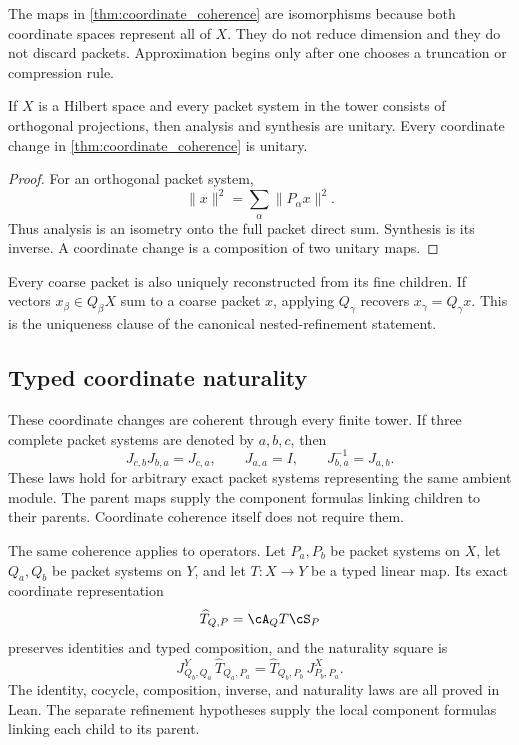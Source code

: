 \begin{remark}\label{rem:refinement_reduction}
The maps in \cref{thm:coordinate_coherence} are isomorphisms because both coordinate spaces represent all of $X$.  They do not reduce dimension and they do not discard packets.  Approximation begins only after one chooses a truncation or compression rule.
\end{remark}

\begin{corollary}\label{cor:orthogonal_isometry}
If $X$ is a Hilbert space and every packet system in the tower consists of orthogonal projections, then analysis and synthesis are unitary.  Every coordinate change in \cref{thm:coordinate_coherence} is unitary.
\end{corollary}

\begin{proof}
For an orthogonal packet system,
\[
\|x\|^2=\sum_\alpha\|P_\alpha x\|^2.
\]
Thus analysis is an isometry onto the full packet direct sum.  Synthesis is its inverse.  A coordinate change is a composition of two unitary maps.
\end{proof}

Every coarse packet is also uniquely reconstructed from its fine children.  If vectors $x_\beta\in Q_\beta X$ sum to a coarse packet $x$, applying $Q_\gamma$ recovers $x_\gamma=Q_\gamma x$.  This is the uniqueness clause of the canonical nested-refinement statement.

\subsection{Typed coordinate naturality}
These coordinate changes are coherent through every finite tower. If three
complete packet systems are denoted by $a,b,c$, then
\[
J_{c,b}J_{b,a}=J_{c,a},
\qquad J_{a,a}=I,
\qquad J_{b,a}^{-1}=J_{a,b}.
\]
These laws hold for arbitrary exact packet systems representing the same
ambient module. The parent maps supply the component formulas linking
children to their parents. Coordinate coherence itself does not require them.

The same coherence applies to operators. Let $P_a,P_b$ be packet systems on $X$, let $Q_a,Q_b$ be packet
systems on $Y$, and let $T:X\to Y$ be a typed linear map. Its exact coordinate
representation
\[
\widehat T_{Q,P}=\cA_QT\cS_P
\]
preserves identities and typed composition, and the naturality square is
\[
\boxed{
J^Y_{Q_b,Q_a}\,\widehat T_{Q_a,P_a}
=
\widehat T_{Q_b,P_b}\,J^X_{P_b,P_a}.
}
\]
The identity, cocycle, composition, inverse, and naturality laws are all proved
in Lean. The separate refinement hypotheses supply the local component
formulas linking each child to its parent.

